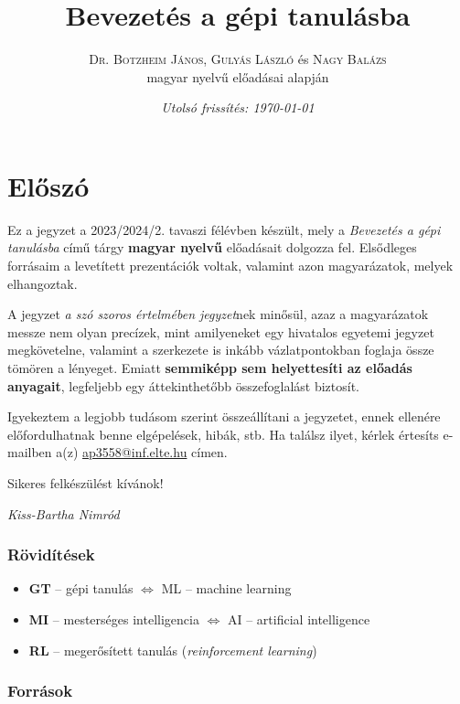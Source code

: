 \documentclass[a4paper, 11pt]{article}
\title{\textbf{Bevezetés a gépi tanulásba}}
\author{\textsc{Dr. Botzheim János}, \textsc{Gulyás László} és \textsc{Nagy Balázs} \\ magyar nyelvű előadásai alapján}
\date{\textit{Utolsó frissítés: \today}}
\begin{document}
	
\maketitle

\section*{Előszó}

Ez a jegyzet a 2023/2024/2. tavaszi félévben készült, mely a \textit{Bevezetés a gépi tanulásba} című tárgy \textbf{magyar nyelvű} előadásait dolgozza fel. Elsődleges forrásaim a levetített prezentációk voltak, valamint azon magyarázatok, melyek elhangoztak.

A jegyzet \textit{a szó szoros értelmében jegyzet}nek minősül, azaz a magyarázatok messze nem olyan precízek, mint amilyeneket egy hivatalos egyetemi jegyzet megkövetelne, valamint a szerkezete is inkább vázlatpontokban foglaja össze tömören a lényeget. Emiatt \textbf{semmiképp sem helyettesíti az előadás anyagait}, legfeljebb egy áttekinthetőbb összefoglalást biztosít.

Igyekeztem a legjobb tudásom szerint összeállítani a jegyzetet, ennek ellenére előfordulhatnak benne elgépelések, hibák, stb. Ha találsz ilyet, kérlek értesíts e-mailben a(z) \href{mailto:ap3558@inf.elte.hu}{ap3558@inf.elte.hu} címen.

Sikeres felkészülést kívánok!


\begin{flushright}
	\textit{Kiss-Bartha Nimród}
\end{flushright}

\subsubsection*{Rövidítések}

\begin{itemize}
	\item \textbf{GT} -- gépi tanulás $\Longleftrightarrow$ ML -- machine learning
	\item \textbf{MI} -- mesterséges intelligencia $\Longleftrightarrow$ AI -- artificial intelligence
	\item \textbf{RL} -- megerősített tanulás (\textit{reinforcement learning})
\end{itemize}

\subsubsection*{Források}
\end{document}
